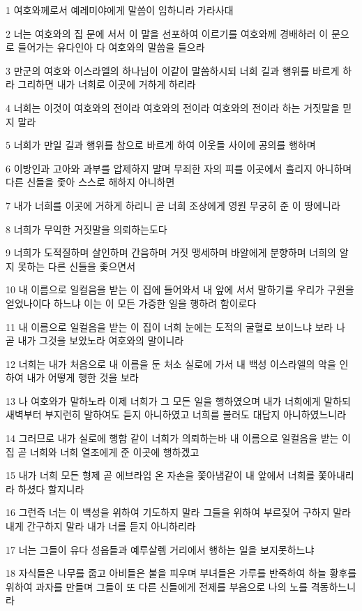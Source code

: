 \par 1 여호와께로서 예레미야에게 말씀이 임하니라 가라사대
\par 2 너는 여호와의 집 문에 서서 이 말을 선포하여 이르기를 여호와께 경배하러 이 문으로 들어가는 유다인아 다 여호와의 말씀을 들으라
\par 3 만군의 여호와 이스라엘의 하나님이 이같이 말씀하시되 너희 길과 행위를 바르게 하라 그리하면 내가 너희로 이곳에 거하게 하리라
\par 4 너희는 이것이 여호와의 전이라 여호와의 전이라 여호와의 전이라 하는 거짓말을 믿지 말라
\par 5 너희가 만일 길과 행위를 참으로 바르게 하여 이웃들 사이에 공의를 행하며
\par 6 이방인과 고아와 과부를 압제하지 말며 무죄한 자의 피를 이곳에서 흘리지 아니하며 다른 신들을 좇아 스스로 해하지 아니하면
\par 7 내가 너희를 이곳에 거하게 하리니 곧 너희 조상에게 영원 무궁히 준 이 땅에니라
\par 8 너희가 무익한 거짓말을 의뢰하는도다
\par 9 너희가 도적질하며 살인하며 간음하며 거짓 맹세하며 바알에게 분향하며 너희의 알지 못하는 다른 신들을 좇으면서
\par 10 내 이름으로 일컬음을 받는 이 집에 들어와서 내 앞에 서서 말하기를 우리가 구원을 얻었나이다 하느냐 이는 이 모든 가증한 일을 행하려 함이로다
\par 11 내 이름으로 일컬음을 받는 이 집이 너희 눈에는 도적의 굴혈로 보이느냐 보라 나 곧 내가 그것을 보았노라 여호와의 말이니라
\par 12 너희는 내가 처음으로 내 이름을 둔 처소 실로에 가서 내 백성 이스라엘의 악을 인하여 내가 어떻게 행한 것을 보라
\par 13 나 여호와가 말하노라 이제 너희가 그 모든 일을 행하였으며 내가 너희에게 말하되 새벽부터 부지런히 말하여도 듣지 아니하였고 너희를 불러도 대답지 아니하였느니라
\par 14 그러므로 내가 실로에 행함 같이 너희가 의뢰하는바 내 이름으로 일컬음을 받는 이 집 곧 너희와 너희 열조에게 준 이곳에 행하겠고
\par 15 내가 너희 모든 형제 곧 에브라임 온 자손을 쫓아냄같이 내 앞에서 너희를 쫓아내리라 하셨다 할지니라
\par 16 그런즉 너는 이 백성을 위하여 기도하지 말라 그들을 위하여 부르짖어 구하지 말라 내게 간구하지 말라 내가 너를 듣지 아니하리라
\par 17 너는 그들이 유다 성읍들과 예루살렘 거리에서 행하는 일을 보지못하느냐
\par 18 자식들은 나무를 줍고 아비들은 불을 피우며 부녀들은 가루를 반죽하여 하늘 황후를 위하여 과자를 만들며 그들이 또 다른 신들에게 전제를 부음으로 나의 노를 격동하느니라
